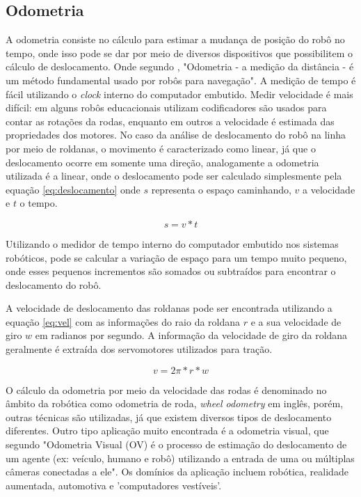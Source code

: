 \subsection{Odometria}\label{sec:odom}
A odometria consiste no cálculo para estimar a mudança de posição do robô no tempo, onde isso pode se dar por meio de diversos dispositivos que possibilitem o cálculo de deslocamento. Onde segundo \cite{ben2018robotic}, "Odometria - a medição da distância - é um método fundamental usado por robôs para navegação". A medição de tempo é fácil utilizando o \textit{clock} interno do computador embutido. Medir velocidade é mais difícil: em alguns robôs educacionais utilizam codificadores são usados para contar as rotações da rodas, enquanto em outros a velocidade é estimada das propriedades dos motores. 
No caso da análise de deslocamento do robô na linha por meio de roldanas, o movimento é caracterizado como linear, já que o deslocamento ocorre em somente uma direção, analogamente a odometria utilizada é a linear, onde o deslocamento pode ser calculado simplesmente pela equação \ref{eq:deslocamento} onde $s$ representa o espaço caminhando, $v$ a velocidade e $t$ o tempo. 

\begin{equation}\label{eq:deslocamento}
s = v*t
\end{equation}

Utilizando o medidor de tempo interno do computador embutido nos sistemas robóticos, pode se calcular a variação de espaço para um tempo muito pequeno, onde esses pequenos incrementos são somados ou subtraídos para encontrar o deslocamento do robô.

A velocidade de deslocamento das roldanas pode ser encontrada utilizando a equação \ref{eq:vel} com as informações do raio da roldana $r$ e a sua velocidade de giro $w$ em radianos por segundo. A informação da velocidade de giro da roldana geralmente é extraída dos servomotores utilizados para tração.

\begin{equation}\label{eq:vel}
v = 2\pi*r*w
\end{equation}

O cálculo da odometria por meio da velocidade das rodas é denominado no âmbito da robótica como odometria de roda, \textit{wheel odometry} em inglês, porém, outras técnicas são utilizadas, já que existem diversos tipos de deslocamento diferentes. Outro tipo aplicação muito encontrada é a odometria visual, que segundo \cite{nister2004visual} "Odometria Visual (OV) é o processo de estimação do deslocamento de um agente (ex: veículo, humano e robô) utilizando a entrada de uma ou múltiplas câmeras conectadas a ele". Os domínios da aplicação incluem robótica, realidade aumentada, automotiva e 'computadores vestíveis'.

